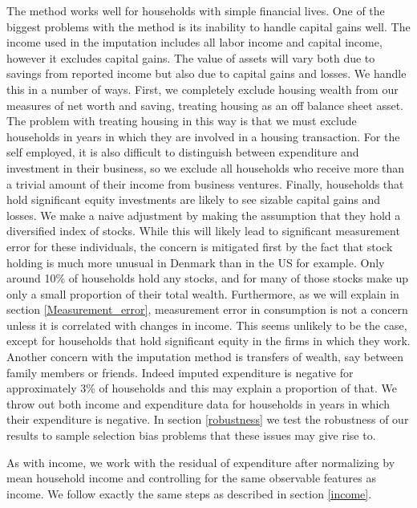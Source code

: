 \documentclass[titlepage]{\econtex}\newcommand{\texname}{ConsumptionHeterogeneity}
\begin{document}
The method works well for households with simple financial lives. One of the biggest problems with the method is its inability to handle capital gains well. The income used in the imputation includes all labor income and capital income, however it excludes capital gains. The value of assets will vary both due to savings from reported income but also due to capital gains and losses. We handle this in a number of ways. First, we completely exclude housing wealth from our measures of net worth and saving, treating housing as an off balance sheet asset. The problem with treating housing in this way is that we must exclude households in years in which they are involved in a housing transaction. For the self employed, it is also difficult to distinguish between expenditure and investment in their business, so we exclude all households who receive more than a trivial amount of their income from business ventures. Finally, households that hold significant equity investments are likely to see sizable capital gains and losses. We make a naive adjustment by making the assumption that they hold a diversified index of stocks. While this will likely lead to significant measurement error for these individuals, the concern is mitigated first by the fact that stock holding is much more unusual in Denmark than in the US for example. Only around 10\% of households hold any stocks, and for many of those stocks make up only a small proportion of their total wealth. Furthermore, as we will explain in section \ref{Measurement_error}, measurement error in consumption is not a concern unless it is correlated with changes in income. This seems unlikely to be the case, except for households that hold significant equity in the firms in which they work. Another concern with the imputation method is transfers of wealth, say between family members or friends. Indeed imputed expenditure is negative for approximately 3\% of households and this may explain a proportion of that. We throw out both income and expenditure data for households in years in which their expenditure is negative. In section \ref{robustness} we test the robustness of our results to sample selection bias problems that these issues may give rise to.

As with income, we work with the residual of expenditure after normalizing by mean household income and controlling for the same observable features as income. We follow exactly the same steps as described in section \ref{income}.
\end{document}
